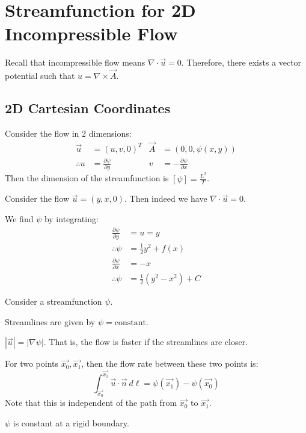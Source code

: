 \documentclass[../Main.tex]{subfiles}
\begin{document}
\section{Streamfunction for 2D Incompressible Flow}
Recall that incompressible flow means $\nabla \cdot \vec{u} = 0$. Therefore, there exists a vector potential such that $u = \nabla \times \vec{A}$.

\subsection{2D Cartesian Coordinates}
Consider the flow in 2 dimensions:
\begin{align*}
    \vec{u} &= (u, v, 0)^T & \vec{A} &= (0, 0, \psi(x, y)) \\
    \therefore u &= \frac{\partial \psi}{\partial y} & v &= -\frac{\partial \psi}{\partial x}
\end{align*}
Then the dimension of the streamfunction is $[\psi] = \frac{L^2}{T}$.
\begin{example}
    Consider the flow $\vec{u} = (y, x, 0)$. Then indeed we have $\nabla \cdot \vec{u} = 0$.

    We find $\psi$ by integrating:
    \begin{align*}
        \frac{\partial \psi}{\partial y} &= u = y \\
        \therefore \psi &= \frac12 y^2 + f(x) \\
        \frac{\partial \psi}{\partial x} &= -x \\
        \therefore \psi &= \frac12 (y^2 - x^2) + C
    \end{align*}
\end{example}
\begin{propositions}{
        Consider a streamfunction $\psi$.
        \label{propsStreamfunction}
    }
    \item Streamlines are given by $\psi = \text{constant}$.
    \item $|\vec{u}| = |\nabla \psi|$. That is, the flow is faster if the streamlines are closer.
    \item For two points $\vec{x_0}, \vec{x_1}$, then the flow rate between these two points is:
        \begin{equation*}
            \int_{\vec{x_0}}^{\vec{x_1}} \vec{u} \cdot \vec{n}~d\ell = \psi(\vec{x_1}) - \psi(\vec{x_0})
        \end{equation*}
        Note that this is independent of the path from $\vec{x_0}$ to $\vec{x_1}$.
    \item $\psi$ is constant at a rigid boundary.
\end{propositions}
\end{document}
